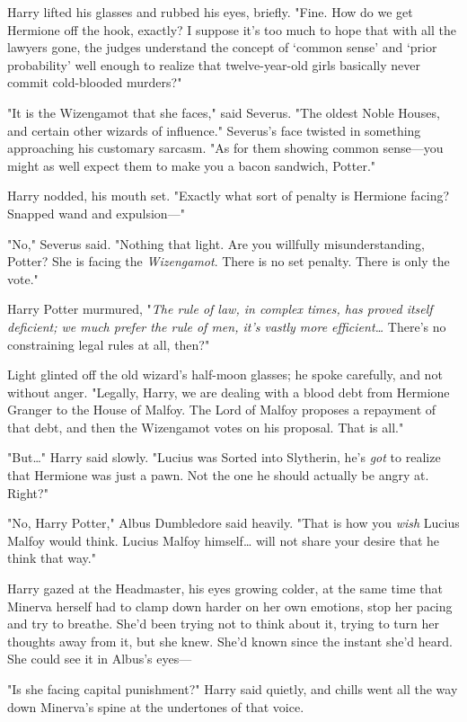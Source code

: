 Harry lifted his glasses and rubbed his eyes, briefly. "Fine. How do we get 
Hermione off the hook, exactly? I suppose it's too much to hope that with all 
the lawyers gone, the judges understand the concept of `common sense' and 
`prior probability' well enough to realize that twelve-year-old girls basically 
never commit cold-blooded murders?"

"It is the Wizengamot that she faces," said Severus. "The oldest Noble Houses, 
and certain other wizards of influence." Severus's face twisted in something 
approaching his customary sarcasm. "As for them showing common sense---you 
might as well expect them to make you a bacon sandwich, Potter."

Harry nodded, his mouth set. "Exactly what sort of penalty is Hermione facing? 
Snapped wand and expulsion---"

"No," Severus said. "Nothing that light. Are you willfully misunderstanding, 
Potter? She is facing the \emph{Wizengamot}. There is no set penalty. There is 
only the vote."

Harry Potter murmured, "\emph{The rule of law, in complex times, has proved 
itself deficient; we much prefer the rule of men, it's vastly more 
efficient{\ldots}} There's no constraining legal rules at all, then?"

Light glinted off the old wizard's half-moon glasses; he spoke carefully, and 
not without anger. "Legally, Harry, we are dealing with a blood debt from 
Hermione Granger to the House of Malfoy. The Lord of Malfoy proposes a 
repayment of that debt, and then the Wizengamot votes on his proposal. That is 
all."

"But{\ldots}" Harry said slowly. "Lucius was Sorted into Slytherin, he's 
\emph{got} to realize that Hermione was just a pawn. Not the one he should 
actually be angry at. Right?"

"No, Harry Potter," Albus Dumbledore said heavily. "That is how you \emph{wish} 
Lucius Malfoy would think. Lucius Malfoy himself{\ldots} will not share your 
desire that he think that way."

Harry gazed at the Headmaster, his eyes growing colder, at the same time that 
Minerva herself had to clamp down harder on her own emotions, stop her pacing 
and try to breathe. She'd been trying not to think about it, trying to turn her 
thoughts away from it, but she knew. She'd known since the instant she'd heard. 
She could see it in Albus's eyes---

"Is she facing capital punishment?" Harry said quietly, and chills went all the 
way down Minerva's spine at the undertones of that voice.

